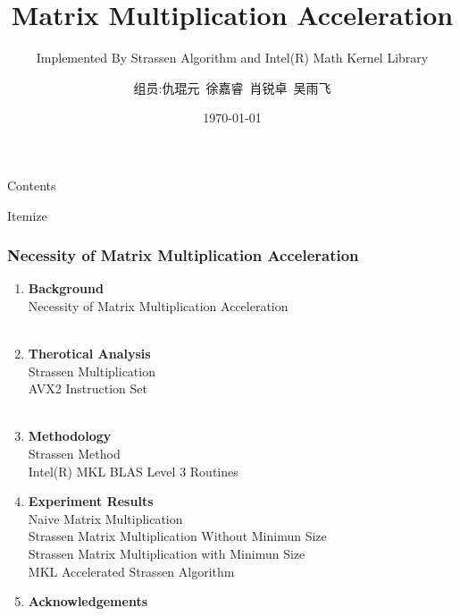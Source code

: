 \documentclass[cjk]{beamer}
\author{组员:仇琨元\ 徐嘉睿\ 肖锐卓\ 吴雨飞}
\title{Matrix Multiplication Acceleration}
\subtitle{Implemented By Strassen Algorithm and Intel(R) Math Kernel Library}
\institute{Insitute of EEE \\ SUSTC}
\date{\today}
\begin{document}
\begin{frame}[plain]
  \titlepage
\end{frame}

\begin{frame}{Contents}
  \tableofcontents
\end{frame}



\begin{frame}{Itemize}
  \frametitle{{\small Necessity of Matrix Multiplication Acceleration}}
  \begin{enumerate}
    \normalsize

    \item \textbf{Background}\\
          {\tiny Necessity of Matrix Multiplication Acceleration}\\
          \qquad\\
    \item \textbf{Therotical Analysis}\\
          {\tiny Strassen Multiplication}\\
          {\tiny AVX2 Instruction Set}\\
          \qquad\\
    \item \textbf{Methodology}\\
          {\tiny Strassen Method}\\
          {\tiny Intel(R) MKL BLAS Level 3 Routines}\\
          \qquad
    \item \textbf{Experiment Results}\\
          {\tiny Naive Matrix Multiplication}\\
          {\tiny Strassen Matrix Multiplication Without Minimun Size}\\
          {\tiny Strassen Matrix Multiplication with Minimun Size}\\
          {\tiny MKL Accelerated Strassen Algorithm}
          \qquad\\
    \item \textbf{Acknowledgements}\\
  \end{enumerate}
\end{frame}
\end{document}
